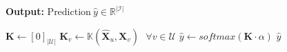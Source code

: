 \documentclass{article}
\begin{document}
\begin{figure*}[h]
\begin{minipage}{0.49\textwidth}
\begin{algorithm}[H]
\begin{flushleft}
        \textbf{Output:} $\text{Prediction}~ \hat{y} \in \mathbb{R}^{|\mathcal{I}|}$
    \end{flushleft}
    \begin{algorithmic}[1]
            \State $\mathbf{K} \leftarrow [0]_{|\mathcal{U}|}$ 
            \State $\mathbf{K}_{v} \leftarrow \mathbb{K}(\hat{\mathbf{X}}_u, \mathbf{X}_v) ~~~ \forall v \in \mathcal{U}$
            \State $\hat{y} \leftarrow softmax(\mathbf{K} \cdot \alpha)$
            \State \Return $\hat{y}$
        \EndProcedure
    \end{algorithmic}
\end{algorithm} \end{minipage}
\end{figure*} 
\end{document}

